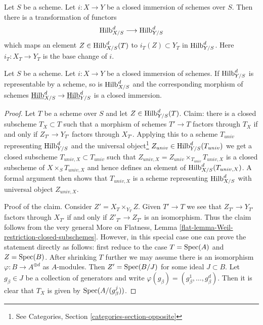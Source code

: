 \noindent
Let $S$ be a scheme. Let $i : X \to Y$ be a closed immersion of schemes
over $S$. Then there is a transformation of functors
$$
\mathrm{Hilb}^d_{X/S} \longrightarrow \mathrm{Hilb}^d_{Y/S}
$$
which maps an element $Z \in \mathrm{Hilb}^d_{X/S}(T)$ to
$i_T(Z) \subset Y_T$ in $\mathrm{Hilb}^d_{Y/S}$. Here $i_T : X_T \to Y_T$
is the base change of $i$.

\begin{lemma}
\label{lemma-hilb-d-of-closed}
Let $S$ be a scheme. Let $i : X \to Y$ be a closed immersion of schemes.
If $\mathrm{Hilb}^d_{Y/S}$ is representable by a scheme, so is
$\mathrm{Hilb}^d_{X/S}$ and the corresponding morphism of schemes
$\underline{\mathrm{Hilb}}^d_{X/S} \to \underline{\mathrm{Hilb}}^d_{Y/S}$
is a closed immersion.
\end{lemma}

\begin{proof}
Let $T$ be a scheme over $S$ and let $Z \in \mathrm{Hilb}^d_{Y/S}(T)$.
Claim: there is a closed subscheme $T_X \subset T$ such
that a morphism of schemes $T' \to T$ factors through $T_X$ if
and only if $Z_{T'} \to Y_{T'}$ factors through $X_{T'}$.
Applying this to a scheme $T_{univ}$ representing $\mathrm{Hilb}^d_{Y/S}$ and the
universal object\footnote{See
Categories, Section \ref{categories-section-opposite}}
$Z_{univ} \in \mathrm{Hilb}^d_{Y/S}(T_{univ})$
we get a closed subscheme $T_{univ, X} \subset T_{univ}$ such that
$Z_{univ, X} = Z_{univ} \times_{T_{univ}} T_{univ, X}$
is a closed subscheme of $X \times_S T_{univ, X}$ and hence
defines an element of $\mathrm{Hilb}^d_{X/S}(T_{univ, X})$.
A formal argument then shows that $T_{univ, X}$ is a scheme
representing $\mathrm{Hilb}^d_{X/S}$ with universal object $Z_{univ, X}$.

\medskip\noindent
Proof of the claim. Consider $Z' = X_T \times_{Y_T} Z$. Given $T' \to T$
we see that $Z_{T'} \to Y_{T'}$ factors through $X_{T'}$ if and
only if $Z'_{T'} \to Z_{T'}$ is an isomorphism. Thus the claim follows
from the very general
More on Flatness, Lemma \ref{flat-lemma-Weil-restriction-closed-subschemes}.
However, in this special case one can prove the statement directly as
follows: first reduce to the case $T = \mathop{\mathrm{Spec}}(A)$ and $Z = \mathop{\mathrm{Spec}}(B)$.
After shrinking $T$ further we may assume there is an isomorphism
$\varphi : B \to A^{\oplus d}$ as $A$-modules. Then $Z' = \mathop{\mathrm{Spec}}(B/J)$
for some ideal $J \subset B$. Let $g_\beta \in J$ be a collection of
generators and write $\varphi(g_\beta) = (g_\beta^1, \ldots, g_\beta^d)$.
Then it is clear that $T_X$ is given by $\mathop{\mathrm{Spec}}(A/(g_\beta^j))$.
\end{proof}

